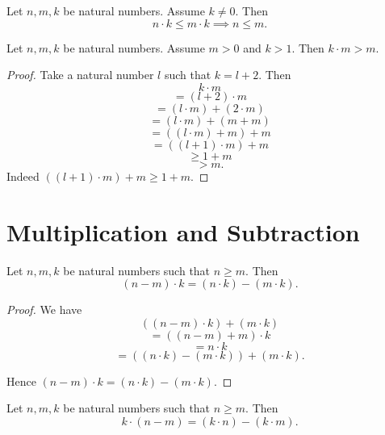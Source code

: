 \documentclass[10pt]{article}
\begin{document}
  \begin{forthel}
    \begin{corollary}
      Let $n, m, k$ be natural numbers.
      Assume $k \neq 0$.
      Then \[ n \cdot k \leq m \cdot k \implies n \leq m. \]
    \end{corollary}
  \end{forthel}

  \begin{forthel}
    \begin{proposition}
      Let $n, m, k$ be natural numbers.
      Assume $m > 0$ and $k > 1$.
      Then $k \cdot m > m$.
    \end{proposition}
    \begin{proof}
      Take a natural number $l$ such that $k = l + 2$.
      Then
      \[  k \cdot m                       \]
      \[    = (l + 2) \cdot m             \]
      \[    = (l \cdot m) + (2 \cdot m)   \]
      \[    = (l \cdot m) + (m + m)       \]
      \[    = ((l \cdot m) + m) + m       \]
      \[    = ((l + 1) \cdot m) + m       \]
      \[    \geq 1 + m                    \]
      \[    > m.                          \]
      Indeed $((l + 1) \cdot m) + m \geq 1 + m$.
    \end{proof}
  \end{forthel}


  \section{Multiplication and Subtraction}

  \begin{forthel}
    \begin{proposition}
      Let $n, m, k$ be natural numbers such that $n \geq m$.
      Then \[ (n - m) \cdot k = (n \cdot k) - (m \cdot k). \]
    \end{proposition}
    \begin{proof}
      We have
      \[  ((n - m) \cdot k) + (m \cdot k)                 \]
      \[    = ((n - m) + m) \cdot k                       \]
      \[    = n \cdot k                                   \]
      \[    = ((n \cdot k) - (m \cdot k)) + (m \cdot k).  \]

      Hence $(n - m) \cdot k = (n \cdot k) - (m \cdot k)$.
    \end{proof}
  \end{forthel}

  \begin{forthel}
    \begin{corollary}
      Let $n, m, k$ be natural numbers such that $n \geq m$.
      Then \[ k \cdot (n - m) = (k \cdot n) - (k \cdot m). \]
    \end{corollary}
  \end{forthel}
\end{document}
